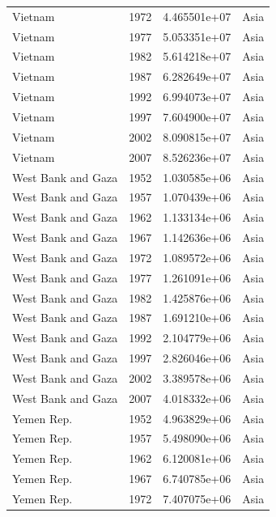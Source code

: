 \documentclass[
  letterpaper,
  DIV=11,
  numbers=noendperiod]{scrreprt}
\begin{document}
\begin{tcolorbox}
\begin{tabular}{lrrl}
Vietnam                  &  1972 &  4.465501e+07 &      Asia \\
Vietnam                  &  1977 &  5.053351e+07 &      Asia \\
Vietnam                  &  1982 &  5.614218e+07 &      Asia \\
Vietnam                  &  1987 &  6.282649e+07 &      Asia \\
Vietnam                  &  1992 &  6.994073e+07 &      Asia \\
Vietnam                  &  1997 &  7.604900e+07 &      Asia \\
Vietnam                  &  2002 &  8.090815e+07 &      Asia \\
Vietnam                  &  2007 &  8.526236e+07 &      Asia \\
West Bank and Gaza       &  1952 &  1.030585e+06 &      Asia \\
West Bank and Gaza       &  1957 &  1.070439e+06 &      Asia \\
West Bank and Gaza       &  1962 &  1.133134e+06 &      Asia \\
West Bank and Gaza       &  1967 &  1.142636e+06 &      Asia \\
West Bank and Gaza       &  1972 &  1.089572e+06 &      Asia \\
West Bank and Gaza       &  1977 &  1.261091e+06 &      Asia \\
West Bank and Gaza       &  1982 &  1.425876e+06 &      Asia \\
West Bank and Gaza       &  1987 &  1.691210e+06 &      Asia \\
West Bank and Gaza       &  1992 &  2.104779e+06 &      Asia \\
West Bank and Gaza       &  1997 &  2.826046e+06 &      Asia \\
West Bank and Gaza       &  2002 &  3.389578e+06 &      Asia \\
West Bank and Gaza       &  2007 &  4.018332e+06 &      Asia \\
Yemen Rep.               &  1952 &  4.963829e+06 &      Asia \\
Yemen Rep.               &  1957 &  5.498090e+06 &      Asia \\
Yemen Rep.               &  1962 &  6.120081e+06 &      Asia \\
Yemen Rep.               &  1967 &  6.740785e+06 &      Asia \\
Yemen Rep.               &  1972 &  7.407075e+06 &      Asia \\

\end{tabular}
\end{tcolorbox}
\end{document}
